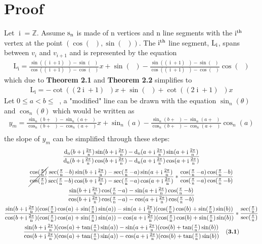 \documentclass[11pt]{article}
\DeclareMathOperator{\custd}{\mathrm{d}_n}
\DeclareMathOperator{\custi}{\mathrm{i}}
\DeclareMathOperator{\period}{\frac{2\pi}{n}}
\DeclareMathOperator{\hp}{\frac{\pi}{n}}
\DeclareMathOperator{\iperiod}{\custi\frac{2\pi}{n}}
\begin{document}
\section{Proof}
Let \(\custi=\mathbb{Z}\). Assume \(\rm s_n\) is made of n vertices and n line segments with the \(\rm i^{th}\) vertex at the point \((\cos(\iperiod), \sin(\iperiod))\). The \(\rm i^{th}\) line segment, \(\rm L_i\), spans between \(v_i\) and \(v_{i+1}\) and is represented by the equation
\begin{gather*}
\mathrm{L_i}=\frac{\sin((\custi+1)\period)-\sin(\iperiod)}{\cos((\custi+1)\period)-\cos(\iperiod)}x+\sin(\iperiod)-\frac{\sin((\custi+1)\period)-\sin(\iperiod)}{\cos((\custi+1)\period)-\cos(\iperiod)}\cos(\iperiod)
\end{gather*}
which due to \textbf{Theorem 2.1} and \textbf{Theorem 2.2} simplifies to 
\begin{gather*}
\mathrm{L_i}=-\cot((2\custi+1)\hp)x+\sin(\iperiod)+\cot((2\custi+1)\hp)x
\end{gather*}
Let \(0\leq a<b\leq\period\), a "modified" line can be drawn with the equation \(\sin_n(\theta)\) and \(\cos_n(\theta)\) which would be written as
\begin{gather*}
y_m=\frac{\sin_n(b+\iperiod)-\sin_n(a+\iperiod)}{\cos_n(b+\iperiod)-\cos_n(a+\iperiod)}x+\sin_n(a)-\frac{\sin_n(b+\iperiod)-\sin_n(a+\iperiod)}{\cos_n(b+\iperiod)-\cos_n(a+\iperiod)}\cos_n(a)\\
\end{gather*}
the slope of \(y_m\) can be simplified through these steps:
\begin{gather*}
\frac{\custd(b+\iperiod)\sin(b+\iperiod)-\custd(a+\iperiod)\sin(a+\iperiod)}{\custd(b+\iperiod)\cos(b+\iperiod)-\custd(a+\iperiod)\cos(a+\iperiod)}\\
\cancel{\frac{\cos(\hp)}{\cos(\hp)}}\frac{\sec(\hp-b)\sin(b+\iperiod)-\sec(\hp-a)\sin(a+\iperiod)}{\sec(\hp-b)\cos(b+\iperiod)-\sec(\hp-a)\cos(a+\iperiod)}*\frac{\cos(\hp-a)\cos(\hp-b)}{\cos(\hp-a)\cos(\hp-b)}\\
\frac{\sin(b+\iperiod)\cos(\hp-a)-\sin(a+\iperiod)\cos(\hp-b)}{\cos(b+\iperiod)\cos(\hp-a)-\cos(a+\iperiod)\cos(\hp-b)}\\
\frac{\sin(b+\iperiod)(\cos(\hp)\cos(a)+\sin(\hp)\sin(a))-\sin(a+\iperiod)(\cos(\hp)\cos(b)+\sin(\hp)\sin(b))}{\cos(b+\iperiod)(\cos(\hp)\cos(a)+\sin(\hp)\sin(a))-\cos(a+\iperiod)(\cos(\hp)\cos(b)+\sin(\hp)\sin(b))}*\frac{\sec(\hp)}{\sec(\hp)}\\
\frac{\sin(b+\iperiod)(\cos(a)+\tan(\hp)\sin(a))-\sin(a+\iperiod)(\cos(b)+\tan(\hp)\sin(b))}{\cos(b+\iperiod)(\cos(a)+\tan(\hp)\sin(a))-\cos(a+\iperiod)(\cos(b)+\tan(\hp)\sin(b))} \ \ \ \mathrm{(\textbf{3.1})}
\end{gather*}
\end{document}
